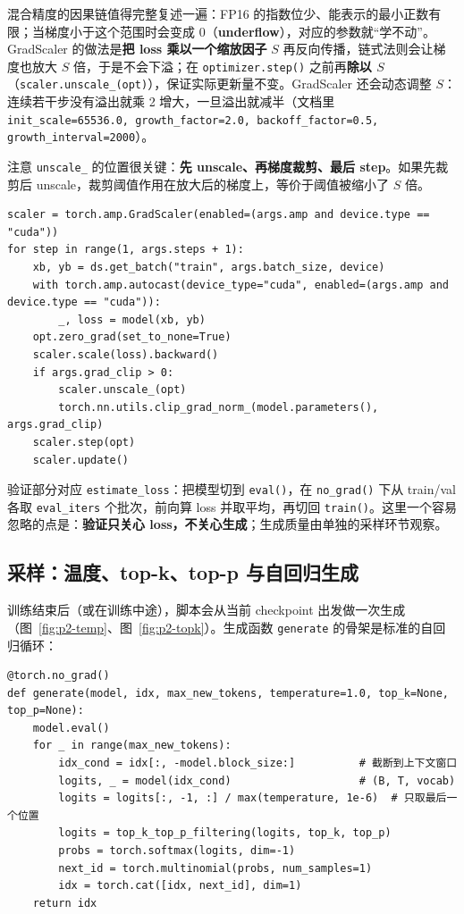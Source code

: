 混合精度的因果链值得完整复述一遍：FP16 的指数位少、能表示的最小正数有限；当梯度小于这个范围时会变成 0（\textbf{underflow}），对应的参数就“学不动”。GradScaler 的做法是\textbf{把 loss 乘以一个缩放因子} $S$ 再反向传播，链式法则会让梯度也放大 $S$ 倍，于是不会下溢；在 \texttt{optimizer.step()} 之前再\textbf{除以 $S$}（\texttt{scaler.unscale\_(opt)}），保证实际更新量不变。GradScaler 还会动态调整 $S$：连续若干步没有溢出就乘 2 增大，一旦溢出就减半（文档里 \texttt{init\_scale=65536.0, growth\_factor=2.0, backoff\_factor=0.5, growth\_interval=2000}）。

注意 \texttt{unscale\_} 的位置很关键：\textbf{先 unscale、再梯度裁剪、最后 step}。如果先裁剪后 unscale，裁剪阈值作用在放大后的梯度上，等价于阈值被缩小了 $S$ 倍。

\begin{lstlisting}[caption={带 AMP 与梯度裁剪的训练步（据视频 \texttt{train.py} 整理，节选核心顺序）。}]
scaler = torch.amp.GradScaler(enabled=(args.amp and device.type == "cuda"))
for step in range(1, args.steps + 1):
    xb, yb = ds.get_batch("train", args.batch_size, device)
    with torch.amp.autocast(device_type="cuda", enabled=(args.amp and device.type == "cuda")):
        _, loss = model(xb, yb)
    opt.zero_grad(set_to_none=True)
    scaler.scale(loss).backward()
    if args.grad_clip > 0:
        scaler.unscale_(opt)
        torch.nn.utils.clip_grad_norm_(model.parameters(), args.grad_clip)
    scaler.step(opt)
    scaler.update()
\end{lstlisting}

\begin{sloppypar}
验证部分对应 \texttt{estimate\_loss}：把模型切到 \texttt{eval()}，在 \texttt{no\_grad()} 下从 train/val 各取 \texttt{eval\_iters} 个批次，前向算 loss 并取平均，再切回 \texttt{train()}。这里一个容易忽略的点是：\textbf{验证只关心 loss，不关心生成}；生成质量由单独的采样环节观察。
\end{sloppypar}

\subsection{采样：温度、top-k、top-p 与自回归生成}

训练结束后（或在训练中途），脚本会从当前 checkpoint 出发做一次生成（图~\ref{fig:p2-temp}、图~\ref{fig:p2-topk}）。生成函数 \texttt{generate} 的骨架是标准的自回归循环：

\begin{lstlisting}[caption={自回归生成的核心（据视频 \texttt{utils.py} / \texttt{model.generate} 整理，简化版）。}]
@torch.no_grad()
def generate(model, idx, max_new_tokens, temperature=1.0, top_k=None, top_p=None):
    model.eval()
    for _ in range(max_new_tokens):
        idx_cond = idx[:, -model.block_size:]          # 截断到上下文窗口
        logits, _ = model(idx_cond)                    # (B, T, vocab)
        logits = logits[:, -1, :] / max(temperature, 1e-6)  # 只取最后一个位置
        logits = top_k_top_p_filtering(logits, top_k, top_p)
        probs = torch.softmax(logits, dim=-1)
        next_id = torch.multinomial(probs, num_samples=1)
        idx = torch.cat([idx, next_id], dim=1)
    return idx
\end{lstlisting}

